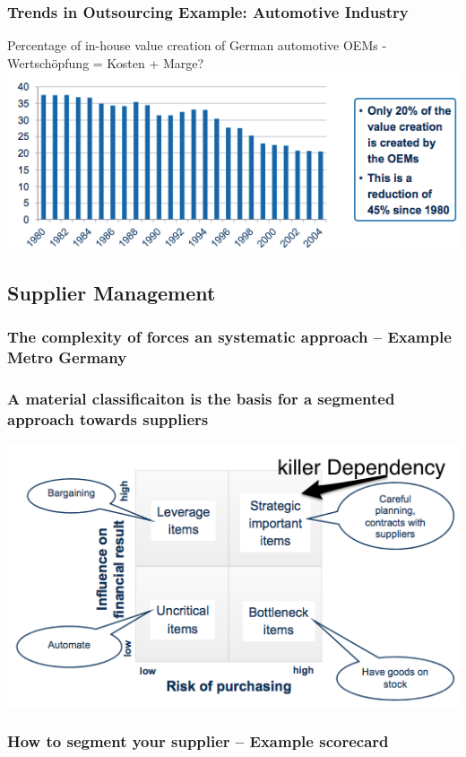 \subsubsection{Trends in Outsourcing Example: Automotive Industry}
Percentage of in-house value creation of German automotive OEMs - Wertsch\"opfung = Kosten + Marge? \\
\includegraphics[width=1\textwidth]{W06/autooem}
\subsection{Supplier Management}
\subsubsection{The complexity of  forces an systematic approach – Example Metro Germany}
\subsubsection{A material classificaiton is the basis for a segmented approach towards suppliers}
\includegraphics[width=1\textwidth]{W06/classification}
\subsubsection{How to segment your supplier – Example scorecard}
